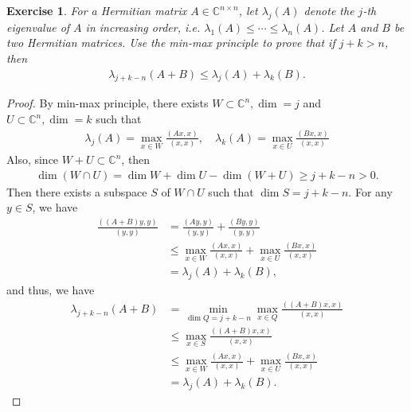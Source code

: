 \documentclass[11pt]{article}
\newtheorem{exercise}{Exercise}[section]
\theoremstyle{definition}
\numberwithin{equation}{subsection}
\begin{document}
\begin{exercise}{\rm *}
For a Hermitian matrix $A \in \mathbb{C}^{n \times n}$, let $\lambda_j(A)$ denote the $j$-th eigenvalue of $A$ in increasing order, i.e. $\lambda_1(A) \leq \cdots \leq \lambda_n(A)$. Let $A$ and $B$ be two Hermitian matrices. Use the min-max principle to prove that if $j + k > n$, then
\begin{align*}
    \lambda_{j+k-n} (A + B) \leq \lambda_j(A) + \lambda_k(B).
\end{align*}
\end{exercise}
\begin{proof}
By min-max principle, there exists $W \subset \mathbb{C}^n, \dim = j$ and $U \subset \mathbb{C}^n, \dim = k$ such that
\begin{align*}
    \lambda_j(A) = \max_{x \in W} \frac{(Ax, x)}{(x,x)}, \quad \lambda_k(A) = \max_{x \in U} \frac{(Bx, x)}{(x,x)}
\end{align*}
Also, since $W + U \subset \mathbb{C}^n$, then
\begin{align*}
    \dim (W \cap U) = \dim W + \dim U - \dim (W + U) \geq j + k - n > 0.
\end{align*}
Then there exists a subspace $S$ of $W \cap U$ such that $\dim S = j + k - n$. For any $y \in S$, we have
\begin{align*}
    \frac{((A+B)y, y)}{(y, y)} & = \frac{(Ay, y)}{(y, y)} + \frac{(By, y)}{(y, y)} \\
    & \leq \max_{x \in W} \frac{(Ax, x)}{(x, x)} + \max_{x \in U} \frac{(Bx, x)}{(x, x)} \\
    & = \lambda_j(A) + \lambda_k(B),
\end{align*}
and thus, we have
\begin{align*}
    \lambda_{j+k-n} (A + B) & = \min_{\dim Q=j+k-n} \max_{x\in Q} \frac{((A+B)x,x)}{(x,x)} \\
    & \leq \max_{x\in S} \frac{((A+B)x,x)}{(x,x)} \\
    & \leq \max_{x \in W} \frac{(Ax, x)}{(x, x)} + \max_{x \in U} \frac{(Bx, x)}{(x, x)} \\
    & = \lambda_j(A) + \lambda_k(B).
\end{align*}
\end{proof}

\medskip
\end{document}
